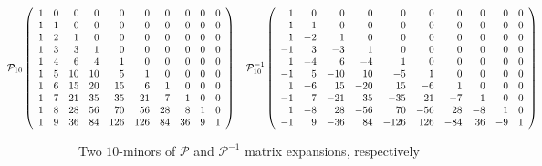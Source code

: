 

\begin{table}
    \begin{displaymath} 
        \hspace{-2.5cm}
        \mathcal{P}_{10}\left(\begin{array}{rrrrrrrrrr}
        1 & 0 & 0 & 0 & 0 & 0 & 0 & 0 & 0 & 0 \\
        1 & 1 & 0 & 0 & 0 & 0 & 0 & 0 & 0 & 0 \\
        1 & 2 & 1 & 0 & 0 & 0 & 0 & 0 & 0 & 0 \\
        1 & 3 & 3 & 1 & 0 & 0 & 0 & 0 & 0 & 0 \\
        1 & 4 & 6 & 4 & 1 & 0 & 0 & 0 & 0 & 0 \\
        1 & 5 & 10 & 10 & 5 & 1 & 0 & 0 & 0 & 0 \\
        1 & 6 & 15 & 20 & 15 & 6 & 1 & 0 & 0 & 0 \\
        1 & 7 & 21 & 35 & 35 & 21 & 7 & 1 & 0 & 0 \\
        1 & 8 & 28 & 56 & 70 & 56 & 28 & 8 & 1 & 0 \\
        1 & 9 & 36 & 84 & 126 & 126 & 84 & 36 & 9 & 1
        \end{array}\right) 
        \quad
        \mathcal{P}_{10}^{-1}\left(\begin{array}{rrrrrrrrrr}
        1 & 0 & 0 & 0 & 0 & 0 & 0 & 0 & 0 & 0 \\
        -1 & 1 & 0 & 0 & 0 & 0 & 0 & 0 & 0 & 0 \\
        1 & -2 & 1 & 0 & 0 & 0 & 0 & 0 & 0 & 0 \\
        -1 & 3 & -3 & 1 & 0 & 0 & 0 & 0 & 0 & 0 \\
        1 & -4 & 6 & -4 & 1 & 0 & 0 & 0 & 0 & 0 \\
        -1 & 5 & -10 & 10 & -5 & 1 & 0 & 0 & 0 & 0 \\
        1 & -6 & 15 & -20 & 15 & -6 & 1 & 0 & 0 & 0 \\
        -1 & 7 & -21 & 35 & -35 & 21 & -7 & 1 & 0 & 0 \\
        1 & -8 & 28 & -56 & 70 & -56 & 28 & -8 & 1 & 0 \\
        -1 & 9 & -36 & 84 & -126 & 126 & -84 & 36 & -9 & 1
        \end{array}\right) 
    \end{displaymath}

  \caption[$\mathcal{P}$ and $\mathcal{P}^{-1}$]{Two $10$-minors of
  $\mathcal{P}$ and $\mathcal{P}^{-1}$ matrix expansions, respectively}

  \label{tab:pascal:array} \end{table}


